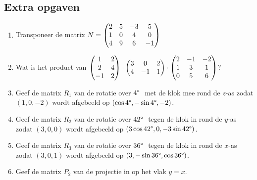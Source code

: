 \subsection{Extra opgaven}
\begin{enumerate}
    \setlength{\itemsep}{10pt}
	\item  Transponeer de matrix $N = \begin{pmatrix} 2&5&-3&5 \\ 1&0&4&0 \\ 4&9&6&-1 \end{pmatrix}$
	
	\item Wat is het product van $\begin{pmatrix} 1&2 \\ 2&4 \\ -1&2 \end{pmatrix} \cdot \begin{pmatrix} 3&0&2 \\ 4&-1&1 \end{pmatrix} \cdot \begin{pmatrix} 2&-1&-2 \\ 1&3&1 \\ 0&5&6 \end{pmatrix}$?
	
	\item Geef de matrix $R_1$ van de rotatie over $4\degree\ $ met de klok mee rond de $z$-as zodat $(1,0,-2)$ wordt afgebeeld op $ (\cos 4\degree , -\sin 4\degree , -2)$.
	
	\item Geef de matrix $R_2$ van de rotatie over $42\degree\ $ tegen de klok in rond de $y$-as zodat $(3,0,0)$ wordt afgebeeld op $ (3\cos 42\degree , 0,  -3\sin 42\degree )$.
	
	\item Geef de matrix $R_3$ van de rotatie over $36\degree\ $ tegen de klok in rond de $x$-as zodat $(3,0,1)$ wordt afgebeeld op $ (3, -\sin 36\degree ,  \cos 36\degree )$. 
	
	\item Geef de matrix $P_2$ van de projectie in \RD op het vlak $y=x$.
\end{enumerate}

